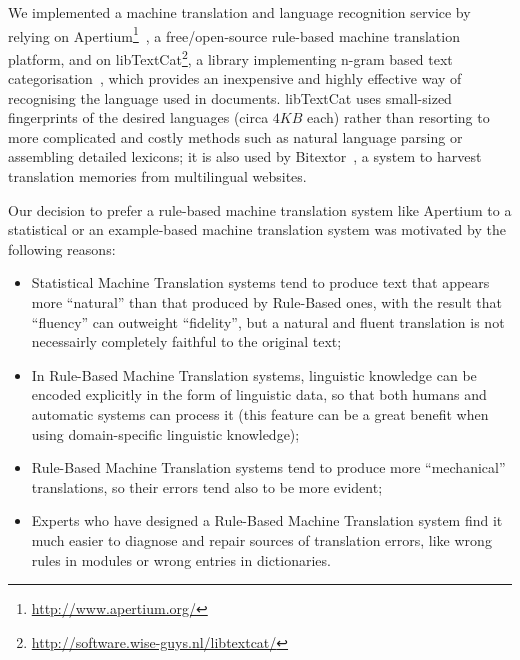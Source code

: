 \documentclass[11pt]{article}
\begin{document}
We implemented a machine translation and language recognition service by relying on Apertium\footnote{\small\url{http://www.apertium.org/}}~\citep{armentano05p}, a free/open-source rule-based machine translation platform, and on libTextCat\footnote{\small\url{http://software.wise-guys.nl/libtextcat/}}, a library implementing n-gram based text categorisation~\citep{textcat}, which provides an inexpensive and highly effective way of recognising the language used in documents. libTextCat uses small-sized fingerprints of the desired languages (circa $4KB$ each) rather than resorting to more complicated and costly methods such as natural language parsing or assembling detailed lexicons; it is also used by Bitextor~\citep{espla-gomis2009bfs}, a system to harvest translation memories from multilingual websites.


Our decision to prefer a rule-based machine translation system like Apertium to a statistical or an example-based machine translation system was  motivated by the following reasons:

\begin{itemize}
 \item Statistical Machine Translation systems tend to produce text that appears more ``natural'' than that produced by Rule-Based ones, with the result that ``fluency'' can outweight ``fidelity'', but a natural and fluent translation is not necessairly completely faithful to the original text;
 \item In Rule-Based Machine Translation systems, linguistic knowledge can be encoded explicitly in the form of linguistic data, so that both humans and automatic systems can process it (this feature can be a great benefit when using domain-specific linguistic knowledge);
 \item Rule-Based Machine Translation systems tend to produce more ``mechanical'' translations, so their errors tend also to be more evident;
 \item Experts who have designed a Rule-Based Machine Translation system find it much easier to diagnose and repair sources of translation errors, like wrong rules in modules or wrong entries in dictionaries.
\end{itemize}
\end{document}
